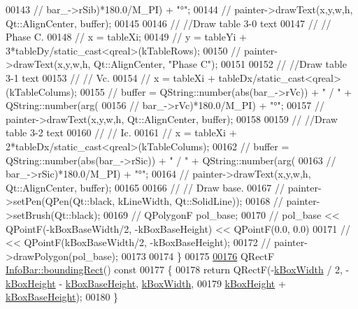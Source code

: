 \begin{DoxyCode}
00143 \textcolor{comment}{//             bar\_->rSib)*180.0/M\_PI) + "°";}
00144 \textcolor{comment}{//  painter->drawText(x,y,w,h, Qt::AlignCenter, buffer);}
00145 
00146 \textcolor{comment}{//  //Draw table 3-0 text}
00147 \textcolor{comment}{//  // Phase C.}
00148 \textcolor{comment}{//  x = tableXi;}
00149 \textcolor{comment}{//  y = tableYi + 3*tableDy/static\_cast<qreal>(kTableRows);}
00150 \textcolor{comment}{//  painter->drawText(x,y,w,h, Qt::AlignCenter, "Phase C");}
00151 
00152 \textcolor{comment}{//  //Draw table 3-1 text}
00153 \textcolor{comment}{//  // Vc.}
00154 \textcolor{comment}{//  x = tableXi + tableDx/static\_cast<qreal>(kTableColums);}
00155 \textcolor{comment}{//  buffer = QString::number(abs(bar\_->rVc)) + " / " + QString::number(arg(}
00156 \textcolor{comment}{//             bar\_->rVc)*180.0/M\_PI) + "°";}
00157 \textcolor{comment}{//  painter->drawText(x,y,w,h, Qt::AlignCenter, buffer);}
00158 
00159 \textcolor{comment}{//  //Draw table 3-2 text}
00160 \textcolor{comment}{//  // Ic.}
00161 \textcolor{comment}{//  x = tableXi + 2*tableDx/static\_cast<qreal>(kTableColums);}
00162 \textcolor{comment}{//  buffer = QString::number(abs(bar\_->rSic)) + " / " + QString::number(arg(}
00163 \textcolor{comment}{//             bar\_->rSic)*180.0/M\_PI) + "°";}
00164 \textcolor{comment}{//  painter->drawText(x,y,w,h, Qt::AlignCenter, buffer);}
00165 
00166 \textcolor{comment}{//  // Draw base.}
00167 \textcolor{comment}{//  painter->setPen(QPen(Qt::black, kLineWidth, Qt::SolidLine));}
00168 \textcolor{comment}{//  painter->setBrush(Qt::black);}
00169 \textcolor{comment}{//  QPolygonF pol\_base;}
00170 \textcolor{comment}{//  pol\_base << QPointF(-kBoxBaseWidth/2, -kBoxBaseHeight) << QPointF(0.0, 0.0)}
00171 \textcolor{comment}{//           << QPointF(kBoxBaseWidth/2, -kBoxBaseHeight);}
00172 \textcolor{comment}{//  painter->drawPolygon(pol\_base);}
00173 
00174 \}
00175 
\hypertarget{infobar_8cpp_source_l00176}{}\hyperlink{class_info_bar_a564aacb3b64bdb5fbcaef8a432a0b49e}{00176} QRectF \hyperlink{class_info_bar_a564aacb3b64bdb5fbcaef8a432a0b49e}{InfoBar::boundingRect}()\textcolor{keyword}{ const}
00177 \textcolor{keyword}{}\{
00178   \textcolor{keywordflow}{return} QRectF(-\hyperlink{class_info_bar_aa1c35ddbae0324743d90721037447571}{kBoxWidth} / 2, -\hyperlink{class_info_bar_aba381a3838a5e064f1372f2f2b4d8e0d}{kBoxHeight} - \hyperlink{class_info_bar_a28fb5e5d6d399d9327f67aa768d4a3d8}{kBoxBaseHeight}, 
      \hyperlink{class_info_bar_aa1c35ddbae0324743d90721037447571}{kBoxWidth},
00179                 \hyperlink{class_info_bar_aba381a3838a5e064f1372f2f2b4d8e0d}{kBoxHeight} + \hyperlink{class_info_bar_a28fb5e5d6d399d9327f67aa768d4a3d8}{kBoxBaseHeight});
00180 \}
\end{DoxyCode}
